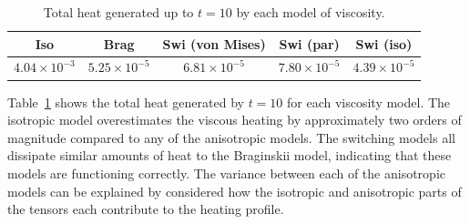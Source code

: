 \begin{table}[t]
  \centering
  \caption{Total heat generated up to $t=10$ by each model of viscosity.}
  \label{tab:total_heating_slow_null}
  \begin{tabular}{ccccc}
Iso & Brag & Swi (von Mises) & Swi (par) & Swi (iso)\\
\midrule
$4.04 \times 10^{-3}$ & $5.25 \times 10^{-5}$ & $6.81 \times 10^{-5}$ & $7.80 \times 10^{-5}$ & $4.39 \times 10^{-5}$
\end{tabular}
\end{table}

Table~\ref{tab:total_heating_slow_null} shows the total heat generated by $t=10$ for each viscosity model. The isotropic model overestimates the viscous heating by approximately two orders of magnitude compared to any of the anisotropic models. The switching models all dissipate similar amounts of heat to the Braginskii model, indicating that these models are functioning correctly. The variance between each of the anisotropic models can be explained by considered how the isotropic and anisotropic parts of the tensors each contribute to the heating profile.

